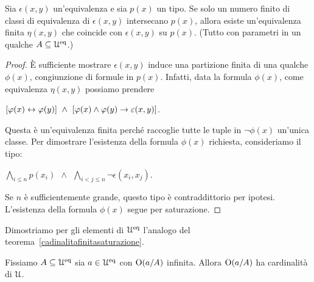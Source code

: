 \begin{lemma}\label{lemmapartizionetipo} Sia $\epsilon(x,y)$ un'equivalenza e sia $p(x)$ un tipo. Se solo un numero finito di classi di equivalenza di $\epsilon(x,y)$ intersecano $p(x)$, allora esiste un'equivalenza finita $\eta(x,y)$ che coincide con $\epsilon(x,y)$ su $p(x)$. (Tutto con parametri in un qualche $A\subseteq\EuScript U^{\rm eq}$.)
\end{lemma}

\begin{proof} \`E sufficiente mostrare $\epsilon(x,y)$ induce una partizione finita di una qualche $\phi(x)$, congiunzione di formule in $p(x)$. Infatti, data la formula $\phi(x)$, come equivalenza $\eta(x,y)$ possiamo prendere 

\hfil$[\phi(x)\iff\phi(y)]\ \wedge\ [\phi(x)\wedge\phi(y)\imp\epsilon(x,y)]$. 

Questa \`e un'equivalenza finita perch\'e raccoglie tutte le tuple in $\neg\phi(x)$ un'unica classe. Per dimostrare l'esistenza della formula $\phi(x)$ richiesta, consideriamo il tipo:

\hfil$\displaystyle\bigwedge_{i\le n} p(x_i)\ \ \wedge \ \ \bigwedge_{i<j\le n} \neg\epsilon(x_i,x_j)$.

Se $n$ \`e sufficientemente grande, questo tipo \`e contraddittorio per ipotesi. L'esistenza della formula $\phi(x)$ segue per saturazione.
\end{proof}

Dimostriamo per gli elementi di $\EuScript U^{\rm eq}$ l'analogo del teorema~\ref{cadinalitafinitasaturazione}.%

\begin{lemma}\label{cadinalitafinitasaturazioneimmaginari}
Fissiamo $A\subseteq\EuScript U^{\rm eq}$ sia $a\in\EuScript U^{\rm eq}$ con $\textrm{O}(a/A)$ infinita. Allora $\textrm{O}(a/A)$ ha cardinalit\`a di $\EuScript U$.
\end{lemma}

